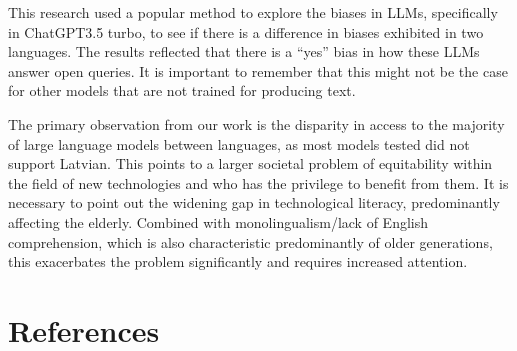 \documentclass[11pt,twocolumn]{article}
\begin{document}
This research used a popular method to explore the biases in LLMs, specifically in ChatGPT3.5 turbo, to see if there is a difference in biases exhibited in two languages. The results reflected that there is a “yes” bias in how these LLMs answer open queries. It is important to remember that this might not be the case for other models that are not trained for producing text.

The primary observation from our work is the disparity in access to the majority of large language models between languages, as most models tested did not support Latvian. This points to a larger societal problem of equitability within the field of new technologies and who has the privilege to benefit from them. It is necessary to point out the widening gap in technological literacy, predominantly affecting the elderly. Combined with monolingualism/lack of English comprehension, which is also characteristic predominantly of older generations, this exacerbates the problem significantly and requires increased attention.

\section{References}
\end{document}
